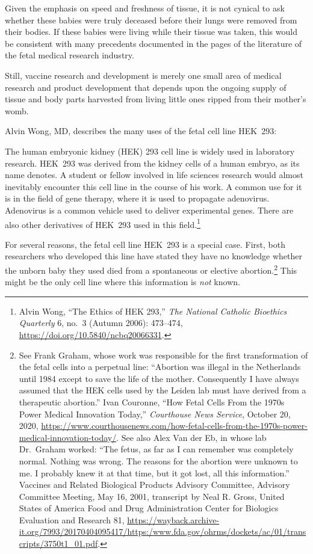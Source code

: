 \documentclass[
]{book}
\begin{document}
Given the emphasis on speed and freshness of tissue, it is not cynical to ask whether these babies were truly deceased before their lungs were removed from their bodies. If these babies were living while their tissue was taken, this would be consistent with many precedents documented in the pages of the literature of the fetal medical research industry.

Still, vaccine research and development is merely one small area of medical research and product development that depends upon the ongoing supply of tissue and body parts harvested from living little ones ripped from their mother's womb.

Alvin Wong, MD, describes the many uses of the fetal cell line HEK~293:

The human embryonic kidney (HEK) 293 cell line is widely used in laboratory research. HEK~293 was derived from the kidney cells of a human embryo, as its name denotes. A student or fellow involved in life sciences research would almost inevitably encounter this cell line in the course of his work. A common use for it is in the field of gene therapy, where it is used to propagate adenovirus. Adenovirus is a common vehicle used to deliver experimental genes. There are also other derivatives of HEK~293 used in this field.\footnote{Alvin Wong, ``The Ethics of HEK 293,'' \emph{The National Catholic Bioethics Quarterly} 6, no.~3 (Autumn 2006): 473--474, \url{https://doi.org/10.5840/ncbq20066331}.}

For several reasons, the fetal cell line HEK~293 is a special case. First, both researchers who developed this line have stated they have no knowledge whether the unborn baby they used died from a spontaneous or elective abortion.\footnote{See Frank Graham, whose work was responsible for the first transformation of the fetal cells into a perpetual line: ``Abortion was illegal in the Netherlands until 1984 except to save the life of the mother. Consequently I have always assumed that the HEK cells used by the Leiden lab must have derived from a therapeutic abortion.'' Ivan Couronne, ``How Fetal Cells From the 1970s Power Medical Innovation Today,'' \emph{Courthouse News Service}, October 20, 2020, \url{https://www.courthousenews.com/how-fetal-cells-from-the-1970s-power-medical-innovation-today/}. See also Alex Van der Eb, in whose lab Dr.~Graham worked: ``The fetus, as far as I can remember was completely normal. Nothing was wrong. The reasons for the abortion were unknown to me. I probably knew it at that time, but it got lost, all this information.'' Vaccines and Related Biological Products Advisory Committee, Advisory Committee Meeting, May 16, 2001, transcript by Neal R. Gross, United States of America Food and Drug Administration Center for Biologics Evaluation and Research 81, \url{https://wayback.archive-it.org/7993/20170404095417/https:/www.fda.gov/ohrms/dockets/ac/01/transcripts/3750t1_01.pdf}.} This might be the only cell line where this information is \emph{not} known.
\end{document}
